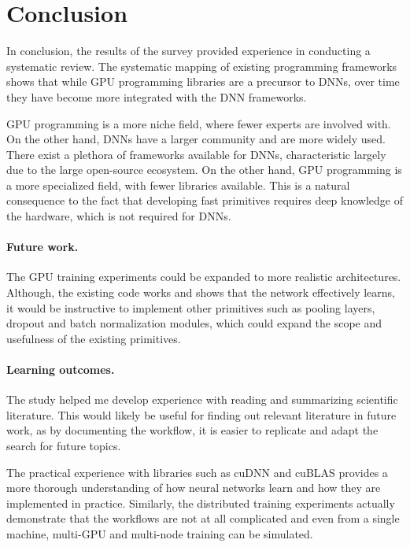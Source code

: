 \section{Conclusion}
\label{sec:conclusion}
In conclusion, the results of the survey provided experience in conducting a systematic review. The
systematic mapping of existing programming frameworks shows that while GPU programming libraries
are a precursor to DNNs, over time they have become more integrated with the DNN frameworks.

GPU programming is a more niche field, where fewer experts are involved with. On the other hand,
DNNs have a larger community and are more widely used. There exist a plethora of frameworks
available for DNNs, characteristic largely due to the large open-source ecosystem. On the other
hand, GPU programming is a more specialized field, with fewer libraries available. This is a
natural consequence to the fact that developing fast primitives requires deep knowledge of the
hardware, which is not required for DNNs.

\paragraph{Future work.}
The GPU training experiments could be expanded to more realistic architectures. Although, the
existing code works and shows that the network effectively learns, it would be instructive to
implement other primitives such as pooling layers, dropout and batch normalization modules, which
could expand the scope and usefulness of the existing primitives.

\paragraph{Learning outcomes.}
The study helped me develop experience with reading and summarizing scientific literature. This
would likely be useful for finding out relevant literature in future work, as by documenting the
workflow, it is easier to replicate and adapt the search for future topics.

The practical experience with libraries such as cuDNN and cuBLAS provides a more thorough
understanding of how neural networks learn and how they are implemented in practice. Similarly, the
distributed training experiments actually demonstrate that the workflows are not at all complicated
and even from a single machine, multi-GPU and multi-node training can be simulated.

